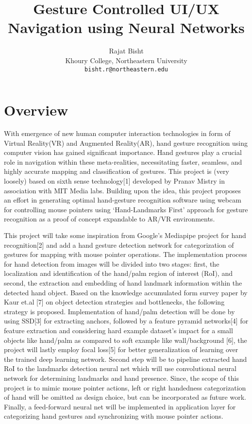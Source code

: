\documentclass{article}
\title{Gesture Controlled UI/UX Navigation using Neural Networks}
\author{Rajat Bisht\\
  Khoury College, Northeastern University \\
  \texttt{bisht.r@northeastern.edu}
}
\begin{document}
\maketitle


\section{Overview}
With emergence of new human computer interaction technologies in form of Virtual Reality(VR) and Augmented Reality(AR), hand gesture recognition using computer vision has gained significant importance. Hand gestures play a crucial role in navigation within these meta-realities, necessitating faster, seamless, and highly accurate mapping and classification of gestures. This project is (very loosely) based on sixth sense technology[1] developed by Pranav Mistry in association with MIT Media labs. Building upon the idea, this project proposes an effort in generating optimal hand-gesture recognition software using webcam for controlling mouse pointers using ‘Hand-Landmarks First’ approach for gesture recognition as a proof of concept expandable to AR/VR environments. 

This project will take some inspiration from Google’s Mediapipe project for hand recognition[2] and add a hand gesture detection network for categorization of gestures for mapping with mouse pointer operations. The implementation process for hand detection from images will be divided into two stages: first, the localization and identification of the hand/palm region of interest (RoI), and second, the extraction and embedding of hand landmark information within the detected hand object. Based on the knowledge accumulated form survey paper by Kaur et.al [7] on object detection strategies and bottlenecks, the following strategy is proposed. Implementation of hand/palm detection will be done by using SSD[3] for extracting anchors, followed by a feature pyramid networks[4] for feature extraction and considering hard example dataset’s impact for a small objects like hand/palm as compared to soft example like wall/background [6], the project will lastly employ focal loss[5] for better generalization of learning over the trained deep learning network. Second step will be to pipeline extracted hand RoI to the landmarks detection neural net which will use convolutional neural network for determining landmarks and hand presence. Since, the scope of this project is to mimic mouse pointer actions, left or right handedness categorization of hand will be omitted as design choice, but can be incorporated as future work. Finally, a feed-forward neural net will be implemented in application layer for categorizing hand gestures and synchronizing with mouse pointer actions.
\end{document}
